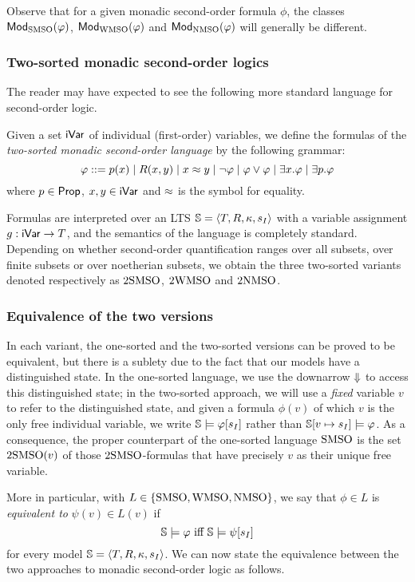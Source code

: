 Observe that for a given monadic second-order formula $\phi$, the classes 
$\mathsf{Mod}_{\mathrm{SMSO}}(\varphi)$, $\mathsf{Mod}_{\mathrm{WMSO}}(\varphi)$ and $\mathsf{Mod}_{\mathrm{NMSO}}(\varphi)$ will 
generally be different.

\subsubsection*{Two-sorted monadic second-order logics}
The reader may have expected to see the following more standard language for
second-order logic.
\begin{definition}
\label{def:2mso}
Given a set $\mathsf{iVar}$ of individual (first-order) variables, we define the 
formulas of the \emph{two-sorted monadic second-order language} by the following
grammar:
\[
\varphi \mathrel{::=}  p(x)
\mid R(x,y)
\mid x \approx y
\mid \neg \varphi
\mid \varphi \lor \varphi
\mid \exists x.\varphi
\mid \exists p.\varphi
\]
where $p \in \mathsf{Prop}$, $x,y \in \mathsf{iVar}$ and $\approx$ is the symbol for equality.   
\end{definition}

Formulas are interpreted over an LTS $\mathbb{S} = \langle{T,R,\kappa, s_I}\rangle$ with a
variable assignment $g: \mathsf{iVar} \to T$, and the semantics of the language is
completely standard. 
Depending on whether second-order quantification ranges over all subsets, over 
finite subsets or over noetherian subsets, we obtain the three two-sorted 
variants denoted respectively as $2\mathrm{SMSO}$, $2\mathrm{WMSO}$ and $2\mathrm{NMSO}$.

\subsubsection*{Equivalence of the two versions}
In each variant, the one-sorted and the two-sorted versions can be proved to
be equivalent, but there is a sublety due to the fact that our models have a 
distinguished state.
In the one-sorted language, we use the downarrow $\here$ to access this
distinguished state; in the two-sorted approach, we will use a \emph{fixed}
variable $v$ to refer to the distinguished state, and given a formula 
$\phi(v)$ of which $v$ is the only free individual variable, we write 
$\mathbb{S} \models \varphi[s_{I}]$ rather than $\mathbb{S}[v \mapsto s_{I}] \models \varphi$.
As a consequence, the proper counterpart of the one-sorted language $\mathrm{SMSO}$ is
the set $2\mathrm{SMSO}(v)$ of those $2\mathrm{SMSO}$-formulas that have precisely $v$ 
as their unique free variable.

More in particular, with $L \in \{\mathrm{SMSO}, \mathrm{WMSO}, \mathrm{NMSO}\}$, we say that $\phi \in
L$ is \emph{equivalent to} $\psi(v) \in L(v)$ if
\[
\bbS \models \phi \text{ iff } \bbS \models \psi[s_{I}]
\]
for every model $\mathbb{S} = \langle{T,R,\kappa, s_I}\rangle$.
We can now state the equivalence between the two approaches to 
monadic second-order logic as follows.

